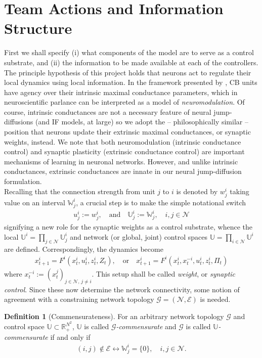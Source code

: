 \documentclass[12pt, oneside]{report}
\newcommand{\mbb}[1]{\mathbb{#1}}
\newcommand{\1}[1]{\mathbbm{1}_{\{#1\}}}
\newcommand{\mc}[1]{\mathcal{#1}}
\theoremstyle{definition}
\newtheorem{definition}[theorem]{Definition}
\begin{document}
\section{Team Actions and Information Structure}
\indent First we shall specify (i) what components of the model are to serve as
a control substrate, and (ii) the information to be made available at each of
the controllers. The principle hypothesis of this project holds that neurons act
to regulate their local dynamics using local information. In the framework
presented by \cite{Sepulchre_2022}, CB units have agency over their intrinsic
maximal conductance parameters, which in neuroscientific parlance can be
interpreted as a model of \textit{neuromodulation}. Of course, intrinsic
conductances are not a necessary feature of neural jump-diffusions (and IF
models, at large) so we adopt the -- philosophically similar -- position that
neurons update their extrinsic maximal conductances, or synaptic weights,
instead. We note that both neuromodulation (intrinsic conductance control) and synaptic plasticity (extrinsic conductance control) are important mechanisms of learning
in neuronal networks. However, and unlike intrinsic conductances, extrinsic conductances are innate in our neural
jump-diffusion formulation.\\[5pt]
\indent Recalling that the connection strength from unit $j$ to $i$
is denoted by $w^i_j$ taking value on an interval $\mbb{W}^i_j$, a
crucial step is to make the simple notational switch
\begin{align*}
    u^i_j:=w^i_j,\quad\text{and}\quad\mbb{U}^i_j:=\mbb{W}^i_j,\quad i,j\in\mc{N}
\end{align*}
signifying a new role for the synaptic weights as a control substrate, whence
the local $\mbb{U}^i=\prod_{j\in\mc{N}}\mbb{U}^i_j$ and network (or global, joint)
control spaces $\mbb{U}=\prod_{i\in\mc{N}}\mbb{U}^i$ are defined. Correspondingly, the dynamics become
\begin{align}
    x^i_{t+1}=F^i(x^i_t,u^i_t,z^i_t,Z_t),\quad\text{or}\quad x^i_{t+1}=F^i(x^i_t,x^{-i}_t,u^i_t,z^i_t,\Pi_t)\label{eq61}
\end{align}
where $x^{-i}_t:=(x^j_t)_{j\in\mc{N},\,j\neq i}$. This setup
shall be called \textit{weight}, or \textit{synaptic control}. Since these now determine the
network connectivity, some notion of agreement with a constraining network
topology $\mc{G}=(\mc{N},\mc{E})$ is needed.
\begin{definition}[Commensurateness]
    For an arbitrary network topology $\mc{G}$ and control space
    $\mbb{U}\subset\mbb{R}_+^{N^2}$, $\mbb{U}$ is called {\it
    $\mc{G}$-commensurate} and $\mc{G}$ is called {\it $\mbb{U}$-commensurate}
    if and only if
    \begin{align*}
        (i,j)\notin\mc{E}\longleftrightarrow \mbb{W}^i_j=\{0\},\quad i,j\in\mc{N}.
    \end{align*}
\end{definition}
\end{document}
